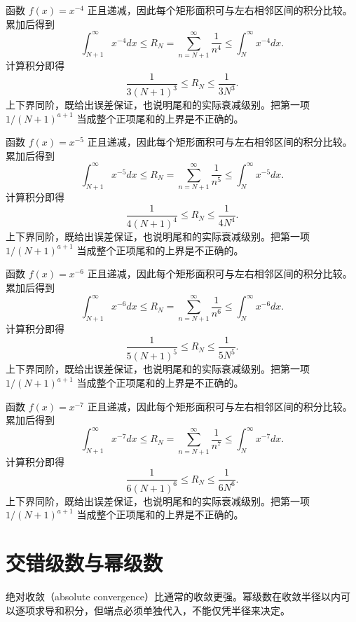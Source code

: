 \documentclass[12pt,fontset=fandol]{ctexart}
\begin{document}
\begin{solve}\label{ans:c25q21}
函数 $f(x)=x^{-4}$ 正且递减，因此每个矩形面积可与左右相邻区间的积分比较。累加后得到
\[
\int_{N+1}^\infty x^{-4}dx\le R_N=\sum_{n=N+1}^\infty\frac1{n^{4}}\le\int_N^\infty x^{-4}dx.
\]
计算积分即得
\[
\frac1{3(N+1)^{3}}\le R_N\le\frac1{3N^{3}}.
\]
上下界同阶，既给出误差保证，也说明尾和的实际衰减级别。把第一项 $1/(N+1)^{a+1}$ 当成整个正项尾和的上界是不正确的。
\end{solve}

\begin{solve}\label{ans:c25q22}
函数 $f(x)=x^{-5}$ 正且递减，因此每个矩形面积可与左右相邻区间的积分比较。累加后得到
\[
\int_{N+1}^\infty x^{-5}dx\le R_N=\sum_{n=N+1}^\infty\frac1{n^{5}}\le\int_N^\infty x^{-5}dx.
\]
计算积分即得
\[
\frac1{4(N+1)^{4}}\le R_N\le\frac1{4N^{4}}.
\]
上下界同阶，既给出误差保证，也说明尾和的实际衰减级别。把第一项 $1/(N+1)^{a+1}$ 当成整个正项尾和的上界是不正确的。
\end{solve}

\begin{solve}\label{ans:c25q23}
函数 $f(x)=x^{-6}$ 正且递减，因此每个矩形面积可与左右相邻区间的积分比较。累加后得到
\[
\int_{N+1}^\infty x^{-6}dx\le R_N=\sum_{n=N+1}^\infty\frac1{n^{6}}\le\int_N^\infty x^{-6}dx.
\]
计算积分即得
\[
\frac1{5(N+1)^{5}}\le R_N\le\frac1{5N^{5}}.
\]
上下界同阶，既给出误差保证，也说明尾和的实际衰减级别。把第一项 $1/(N+1)^{a+1}$ 当成整个正项尾和的上界是不正确的。
\end{solve}

\begin{solve}\label{ans:c25q24}
函数 $f(x)=x^{-7}$ 正且递减，因此每个矩形面积可与左右相邻区间的积分比较。累加后得到
\[
\int_{N+1}^\infty x^{-7}dx\le R_N=\sum_{n=N+1}^\infty\frac1{n^{7}}\le\int_N^\infty x^{-7}dx.
\]
计算积分即得
\[
\frac1{6(N+1)^{6}}\le R_N\le\frac1{6N^{6}}.
\]
上下界同阶，既给出误差保证，也说明尾和的实际衰减级别。把第一项 $1/(N+1)^{a+1}$ 当成整个正项尾和的上界是不正确的。
\end{solve}

\clearpage
\section{交错级数与幂级数}\label{sec:ch26}
绝对收敛（absolute convergence）比通常的收敛更强。幂级数在收敛半径以内可以逐项求导和积分，但端点必须单独代入，不能仅凭半径来决定。
\end{document}
